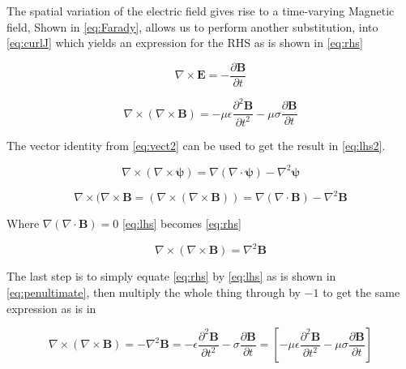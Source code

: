 \documentclass[12pt]{article}
\begin{document}
	The spatial variation of the electric field gives rise to a time-varying Magnetic field, Shown in \cref{eq:Farady},
	allows us to perform another substitution, into \cref{eq:curlJ} which yields an expression for the RHS as is shown in 
	\cref{eq:rhs}

	\begin{equation}
		\label{eq:Farady}
		\nabla \times \mathbf{E} = - \frac{\partial \mathbf{B}} {\partial t}
	\end{equation}

	\begin{equation}
		\label{eq:rhs}
		\nabla \times(\nabla \times \mathbf{B}) = -\mu\epsilon\frac{\partial^{2} \mathbf{B}} {\partial t^{2}} - \mu\sigma\frac{\partial \mathbf{B}} {\partial t}
	\end{equation}

	The vector identity from \cref{eq:vect2} can be used to get the result in \cref{eq:lhs2}.

	\begin{equation}
		\label{eq:vect2}
		\nabla \times \left( \nabla \times \mathbf{\psi} \right) = \nabla(\nabla \cdot \mathbf{\psi}) - \nabla^{2}\mathbf{\psi}
    \end{equation}
	
	\begin{equation}
		\label{eq:lhs}
		\nabla \times(\nabla \times \mathbf{B} =(\nabla \times (\nabla \times \mathbf{B} ))=\nabla(\nabla\cdot\mathbf{B})-\nabla^{2}\mathbf{B}
	\end{equation}
		
	\noindent
	Where $\nabla(\nabla\cdot\mathbf{B})=0$ \cref{eq:lhs} becomes \cref{eq:rhs}
		
	\begin{equation}
		\label{eq:lhs2}
		\nabla \times(\nabla \times \mathbf{B}) =\nabla^{2}\mathbf{B}
	\end{equation}
		
	\noindent
	The last step is to simply equate \cref{eq:rhs} by  \cref{eq:lhs} as is shown in \cref{eq:penultimate}, then multiply the whole thing through by $-1$ to get the same expression as is in 
		
	\begin{equation}
		\label{eq:penultimate}
		\nabla \times(\nabla \times \mathbf{B}) = -\nabla^{2}\mathbf{B} = -\epsilon\frac{\partial^{2}\mathbf{B}} {\partial t^{2}} - \sigma\frac{\partial \mathbf{B}} {\partial t}= [-\mu\epsilon\frac{\partial^{2} \mathbf{B}} {\partial t^{2}} - \mu\sigma\frac{\partial \mathbf{B}} {\partial t}]
	\end{equation}
\end{document}
